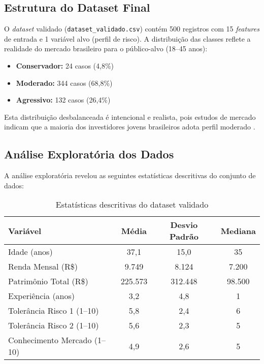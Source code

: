 \subsection{Estrutura do Dataset Final}

O \textit{dataset} validado (\texttt{dataset\_validado.csv}) contém 500 registros com 15 \textit{features} de entrada e 1 variável alvo (perfil de risco). A distribuição das classes reflete a realidade do mercado brasileiro para o público-alvo (18--45 anos):

\begin{itemize}
    \item \textbf{Conservador:} 24 casos (4,8\%)
    \item \textbf{Moderado:} 344 casos (68,8\%)
    \item \textbf{Agressivo:} 132 casos (26,4\%)
\end{itemize}

Esta distribuição desbalanceada é intencional e realista, pois estudos de mercado indicam que a maioria dos investidores jovens brasileiros adota perfil moderado \cite{anbima2022}.

\subsection{Análise Exploratória dos Dados}

A análise exploratória revelou as seguintes estatísticas descritivas do conjunto de dados:

\begin{table}[htbp]
\centering
\caption{Estatísticas descritivas do dataset validado}
\label{tab:stats_dataset}
\begin{tabular}{@{}lccc@{}}
\toprule
\textbf{Variável} & \textbf{Média} & \textbf{Desvio Padrão} & \textbf{Mediana} \\ \midrule
Idade (anos) & 37,1 & 15,0 & 35 \\
Renda Mensal (R\$) & 9.749 & 8.124 & 7.200 \\
Patrimônio Total (R\$) & 225.573 & 312.448 & 98.500 \\
Experiência (anos) & 3,2 & 4,8 & 1 \\
Tolerância Risco 1 (1--10) & 5,8 & 2,4 & 6 \\
Tolerância Risco 2 (1--10) & 5,6 & 2,3 & 5 \\
Conhecimento Mercado (1--10) & 4,9 & 2,6 & 5 \\ \bottomrule
\end{tabular}
\end{table}


